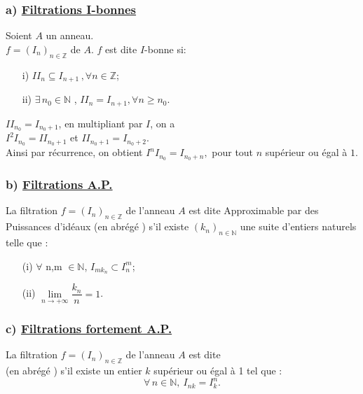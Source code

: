 \subsubsection{a) \underline{Filtrations I-bonnes}} 
\begin{madefinition}
	Soient $A$ un anneau.\\
	$f = (I_n)_{n \in \mathbb{Z}}$ de $A$. $f$ est dite $I$-bonne si:
	\begin{enumerate}
		\item[i)]$ II_n \subseteq I_{n+1} \, ,\forall n \in \mathbb{Z}$;
		\item[ii)]$\exists  \, n_0 \in \mathbb{N}$ , $II_n = I_{n+1}, \forall n \geqslant n_0.$
	\end{enumerate}
\end{madefinition}
\begin{maconsequence}
	$II_{n_0} = I_{n_{0}+1}$, en multipliant par $I$, on a\\ $I^{2}I_{n_0} = II_{n_{0}+1}$ et $II_{n_0+1} = I_{n_{0}+2}$. \\
	Ainsi par récurrence, on obtient $I^{n}I_{n_0} = I_{n_{0}+n},$ pour tout $n$ supérieur ou égal à $1$. 
\end{maconsequence}
\subsubsection{b) \underline{Filtrations A.P.}}
\begin{madefinition}
	La filtration $f = (I_n)_{n \in \mathbb{Z}}$ de l'anneau $A$ est dite Approximable par des Puissances d'idéaux (en abrégé ) s'il existe $(k_{n})_{n \in \mathbb{N}}$ une suite d'entiers naturels telle que :
	\begin{enumerate}
		\item[(i)] $\forall$ n,m $\in \mathbb{N}$, $I_{mk_n} \subset I_n^{m}$;
		\item[(ii)] $\underset{n\longrightarrow +\infty }{\lim }\dfrac{k_{n}}{n}=1$.
	\end{enumerate}
\end{madefinition}
\subsubsection{c) \underline{Filtrations fortement A.P.}}
\begin{madefinition}
	La filtration $f = (I_n)_{n \in \mathbb{Z}}$ de l'anneau $A$ est dite \\  (en abrégé ) s'il existe un entier $k $ supérieur ou égal à 1 tel que :
	\[ \forall \, n \in \mathbb{N}, \ I_{nk} = I_k^n. \]
\end{madefinition}
